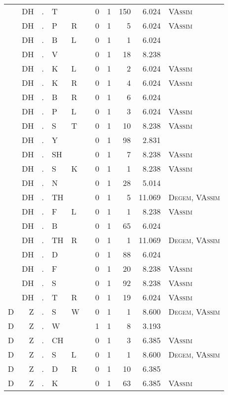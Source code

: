 \begin{longtable}{r@{ } r@{ } c@{ } l@{ } l@{ } l@{ } r r r r l }
 & DH & . & T &  &  & 0 & 1 & 150 & 6.024 & \textsc{VAssim} \\
 & DH & . & P & R &  & 0 & 1 & 5 & 6.024 & \textsc{VAssim} \\
 & DH & . & B & L &  & 0 & 1 & 1 & 6.024 &  \\
 & DH & . & V &  &  & 0 & 1 & 18 & 8.238 &  \\
 & DH & . & K & L &  & 0 & 1 & 2 & 6.024 & \textsc{VAssim} \\
 & DH & . & K & R &  & 0 & 1 & 4 & 6.024 & \textsc{VAssim} \\
 & DH & . & B & R &  & 0 & 1 & 6 & 6.024 &  \\
 & DH & . & P & L &  & 0 & 1 & 3 & 6.024 & \textsc{VAssim} \\
 & DH & . & S & T &  & 0 & 1 & 10 & 8.238 & \textsc{VAssim} \\
 & DH & . & Y &  &  & 0 & 1 & 98 & 2.831 &  \\
 & DH & . & SH &  &  & 0 & 1 & 7 & 8.238 & \textsc{VAssim} \\
 & DH & . & S & K &  & 0 & 1 & 1 & 8.238 & \textsc{VAssim} \\
 & DH & . & N &  &  & 0 & 1 & 28 & 5.014 &  \\
 & DH & . & TH &  &  & 0 & 1 & 5 & 11.069 & \textsc{Degem}, \textsc{VAssim} \\
 & DH & . & F & L &  & 0 & 1 & 1 & 8.238 & \textsc{VAssim} \\
 & DH & . & B &  &  & 0 & 1 & 65 & 6.024 &  \\
 & DH & . & TH & R &  & 0 & 1 & 1 & 11.069 & \textsc{Degem}, \textsc{VAssim} \\
 & DH & . & D &  &  & 0 & 1 & 88 & 6.024 &  \\
 & DH & . & F &  &  & 0 & 1 & 20 & 8.238 & \textsc{VAssim} \\
 & DH & . & S &  &  & 0 & 1 & 92 & 8.238 & \textsc{VAssim} \\
 & DH & . & T & R &  & 0 & 1 & 19 & 6.024 & \textsc{VAssim} \\
D & Z & . & S & W &  & 0 & 1 & 1 & 8.600 & \textsc{Degem}, \textsc{VAssim} \\
D & Z & . & W &  &  & 1 & 1 & 8 & 3.193 &  \\
D & Z & . & CH &  &  & 0 & 1 & 3 & 6.385 & \textsc{VAssim} \\
D & Z & . & S & L &  & 0 & 1 & 1 & 8.600 & \textsc{Degem}, \textsc{VAssim} \\
D & Z & . & D & R &  & 0 & 1 & 10 & 6.385 &  \\
D & Z & . & K &  &  & 0 & 1 & 63 & 6.385 & \textsc{VAssim} \\

\end{longtable}
